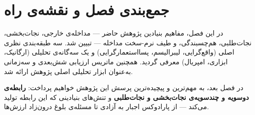 \section{جمع‌بندی فصل و نقشه‌ی راه}
\label{sec:ch01-summary}

در این فصل، مفاهیم بنیادین پژوهش حاضر --- مداخله‌ی خارجی، نجات‌بخشی،
نجات‌طلبی، هم‌چسبندگی، و طیف نرم-سخت مداخله --- تبیین شد. سه
طبقه‌بندی نظری اصلی (واقع‌گرایی، لیبرالیسم، پسااستعمارگرایی) و
یک سه‌گانه‌ی تحلیلی (ارگانیک، ابزاری، امپریال) معرفی گردید. همچنین
ماتریس ارزیابی شش‌بعدی و سه‌زمانی به‌عنوان ابزار تحلیلی اصلی
پژوهش ارائه شد.

در فصل بعد، به مهم‌ترین و پیچیده‌ترین پرسش این پژوهش خواهیم پرداخت:
\textbf{رابطه‌ی دوسویه و چندسویه‌ی نجات‌بخشی و نجات‌طلبی} و
تنش‌های بنیادینی که این رابطه تولید می‌کند --- از پارادوکس اجبار
به آزادی تا مسئله‌ی بلوغ درون‌زاد ارزش‌ها.